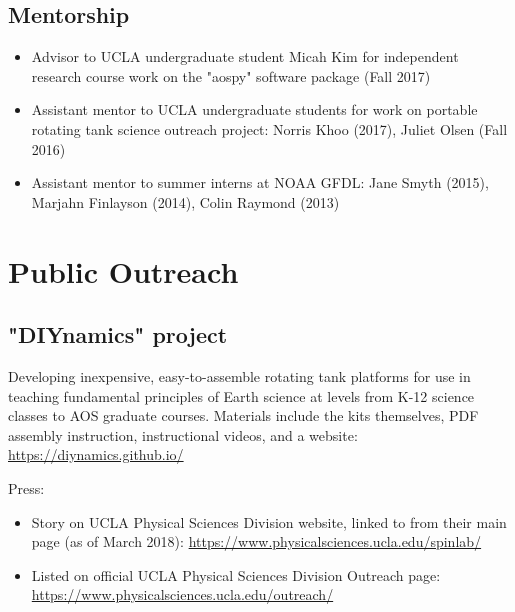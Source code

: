 \documentclass[12pt,letterpaper]{shillcv}
\begin{document}
\subsection*{Mentorship}
\label{sec:org7538ba1}
\begin{itemize}
\item Advisor to UCLA undergraduate student Micah Kim for independent research
course work on the "aospy" software package (Fall 2017)
\item Assistant mentor to UCLA undergraduate students for work on portable rotating
tank science outreach project: Norris Khoo (2017), Juliet Olsen (Fall 2016)
\item Assistant mentor to summer interns at NOAA GFDL: Jane Smyth (2015), Marjahn
Finlayson (2014), Colin Raymond (2013)
\end{itemize}
\section*{Public Outreach}
\label{sec:orgd2238b1}
\subsection*{"DIYnamics" project}
\label{sec:org97fbedb}
Developing inexpensive, easy-to-assemble rotating tank platforms for use in
teaching fundamental principles of Earth science at levels from K-12 science
classes to AOS graduate courses.  Materials include the kits themselves, PDF
assembly instruction, instructional videos, and a website:
\url{https://diynamics.github.io/}

Press:

\begin{itemize}
\item Story on UCLA Physical Sciences Division website, linked to from their main
page (as of March 2018): \url{https://www.physicalsciences.ucla.edu/spinlab/}
\item Listed on official UCLA Physical Sciences Division Outreach page:
\url{https://www.physicalsciences.ucla.edu/outreach/}
\end{itemize}
\end{document}
